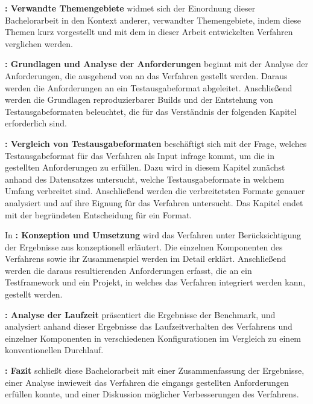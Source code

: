 \textbf{: Verwandte Themengebiete} widmet sich der Einordnung dieser Bachelorarbeit in den Kontext anderer, verwandter Themengebiete, indem diese Themen kurz vorgestellt und mit dem in dieser Arbeit entwickelten Verfahren verglichen werden.

\textbf{: Grundlagen und Analyse der Anforderungen}
beginnt mit der Analyse der Anforderungen, die ausgehend von  an das Verfahren gestellt werden. Daraus werden die Anforderungen an ein Testausgabeformat abgeleitet. Anschließend werden die Grundlagen reproduzierbarer  Builds und der Entstehung von Testausgabeformaten beleuchtet, die für das Verständnis der folgenden Kapitel erforderlich sind.


\textbf{: Vergleich von Testausgabeformaten}
beschäftigt sich mit der Frage, welches Testausgabeformat für das Verfahren als Input infrage kommt, um die in  gestellten Anforderungen zu erfüllen. Dazu wird in diesem Kapitel zunächst anhand des Datensatzes untersucht, welche Testausgabeformate in welchem Umfang verbreitet sind. Anschließend werden die verbreitetsten Formate genauer analysiert und auf ihre Eignung für das Verfahren untersucht. Das Kapitel endet mit der begründeten Entscheidung für ein Format.


In \textbf{: Konzeption und Umsetzung}
wird das Verfahren unter Berücksichtigung der Ergebnisse aus  konzeptionell erläutert. Die einzelnen Komponenten des Verfahrens sowie ihr Zusammenspiel werden im Detail erklärt. Anschließend werden die daraus resultierenden Anforderungen erfasst, die an ein Testframework und ein Projekt, in welches das Verfahren integriert werden kann, gestellt werden.  


\textbf{: Analyse der Laufzeit}
präsentiert die Ergebnisse der Benchmark, und analysiert anhand dieser Ergebnisse das Laufzeitverhalten des Verfahrens und einzelner Komponenten in verschiedenen Konfigurationen im Vergleich zu einem konventionellen Durchlauf. 


\textbf{: Fazit}
schließt diese Bachelorarbeit mit einer Zusammenfassung der Ergebnisse, einer Analyse inwieweit das Verfahren die eingangs gestellten Anforderungen erfüllen konnte, und einer Diskussion möglicher Verbesserungen des Verfahrens. 

